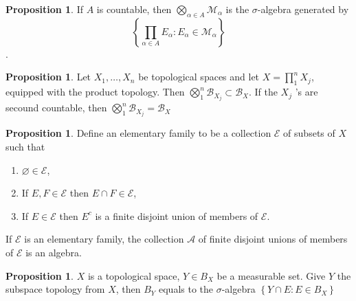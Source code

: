 \documentclass[12pt,a4paper]{book}
\newcommand{\bbrace}[1]{\left\{ #1 \right\} }
\newenvironment{enu}{\begin{enumerate}[(1)]}{\end{enumerate}}
\theoremstyle{definition}
\newtheorem{prop}[defn]{Proposition}
\begin{document}
\begin{prop}
    If $A$ is countable, then $\bigotimes_{\alpha \in A} \mathcal{M}_\alpha$ is the $\sigma$-algebra generated by
    $$\left\{\prod_{\alpha \in A} E_\alpha: E_\alpha \in \mathcal{M}_\alpha\right\}$$.
\end{prop}
\begin{prop}
    Let $X_1, \ldots, X_n$ be topological spaces and let $X=\prod_1^n X_j$, equipped with the product topology. Then $\bigotimes_1^n \mathcal{B}_{X_j} \subset \mathcal{B}_X$. If the $X_j$ 's are secound countable, then $\bigotimes_1^n \mathcal{B}_{X_j}=\mathcal{B}_X$
\end{prop}
\begin{prop}
    Define an elementary family to be a collection $\mathcal{E}$ of subsets of $X$ such that
    \begin{enu}
        \item $\varnothing \in \mathcal{E}$,
        \item If $E, F \in \mathcal{E}$ then $E \cap F \in \mathcal{E}$,
        \item If $E \in \mathcal{E}$ then $E^c$ is a finite disjoint union of members of $\mathcal{E}$.
    \end{enu}
    If $\mathcal{E}$ is an elementary family, the collection $\mathcal{A}$ of finite disjoint unions of members of $\mathcal{E}$ is an algebra.
    \label{proposition:elementary family}
\end{prop}
\begin{prop}
    $X$ is a topological space, $Y\in B_X$ be a measurable set. Give $Y$ the subspace topology from $X$, then $B_Y$ equals to the $\sigma$-algebra $\bbrace{Y\cap E: E\in B_X}$
\end{prop}
\end{document}
